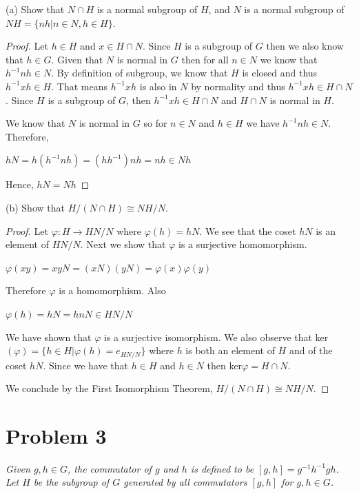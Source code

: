 \documentclass{article}
\theoremstyle{plain} %
\theoremstyle{definition} %
\begin{document}
\noindent(a) Show that $N \cap H$ is a normal subgroup of $H$, and $N$ is a normal
subgroup of $NH = \{nh | n \in N, h \in H \}$.

\begin{proof}
    Let $h \in H$ and $x \in H \cap N$. Since $H$ is a subgroup of
    $G$ then we also know that $h \in G$. Given that $N$ is normal in
    $G$ then for all $n \in N$ we know that $h^{-1}nh \in N$. By definition
    of subgroup, we know that $H$ is closed and thus $h^{-1}xh \in H$.
    That means $h^{-1}xh$ is also in $N$ by normality and thus
    $h^{-1}xh \in H \cap N$.
    Since $H$ is a subgroup of $G$, then $h^{-1}xh \in H \cap N$ and 
    $H \cap N$ is normal in $H$.

    We know that $N$ is normal in $G$ so for $n \in N$ and $h \in H$ we have
    $h^{-1}nh \in N$. Therefore,
    \begin{center}
    $hN = h(h^{-1}nh) = (hh^{-1})nh = nh \in Nh$
    \end{center}
    Hence, $hN = Nh$
\end{proof}

\noindent(b) Show that $H/(N \cap H) \cong NH/N$.

\begin{proof}
    Let $\varphi: H \to HN/N$ where $\varphi(h) = hN$. We see that
    the coset $hN$ is an element of $HN/N$. Next we show that
    $\varphi$ is a surjective homomorphism.
    \begin{center}
        $\varphi(xy) = xyN = (xN)(yN) = \varphi(x)\varphi(y)$
    \end{center}
    Therefore $\varphi$ is a homomorphism. Also 
    \begin{center}
        $\varphi(h) = hN = hnN \in HN/N$
    \end{center}
    We have shown that $\varphi$ is a surjective isomorphism.
    We also observe that ker$(\varphi) = \{h \in H | \varphi(h) = e_{HN/N}\}$
    where $h$ is both an element of $H$ and of the coset $hN$. Since we have that
    $h \in H$ and $h \in N$ then ker$\varphi = H \cap N$.

    We conclude by the First Isomorphism Theorem, $H/(N \cap H) 
    \cong NH/N$.
\end{proof}

\section*{Problem 3}
\noindent\textit{Given $g,h \in G$, the commutator of $g$ and $h$ is
defined to be $[g,h] = g^{-1}h^{-1}gh$. Let $H$ be the subgroup of
$G$ generated by all commutators $[g,h]$ for $g,h\in G$.}
\end{document}
